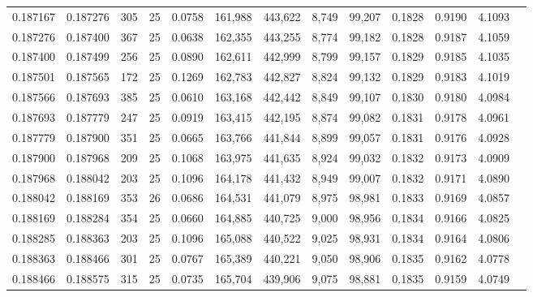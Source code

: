 \begin{tabular}{rrrrrrrrrrrrr}
0.187167 & 0.187276 &   305 &  25 &                                     0.0758 & 161,988 & 443,622 &   8,749 &  99,207 & 0.1828 & 0.9190 & 4.1093 \\
0.187276 & 0.187400 &   367 &  25 &                                     0.0638 & 162,355 & 443,255 &   8,774 &  99,182 & 0.1828 & 0.9187 & 4.1059 \\
0.187400 & 0.187499 &   256 &  25 &                                     0.0890 & 162,611 & 442,999 &   8,799 &  99,157 & 0.1829 & 0.9185 & 4.1035 \\
0.187501 & 0.187565 &   172 &  25 &                                     0.1269 & 162,783 & 442,827 &   8,824 &  99,132 & 0.1829 & 0.9183 & 4.1019 \\
0.187566 & 0.187693 &   385 &  25 &                                     0.0610 & 163,168 & 442,442 &   8,849 &  99,107 & 0.1830 & 0.9180 & 4.0984 \\
0.187693 & 0.187779 &   247 &  25 &                                     0.0919 & 163,415 & 442,195 &   8,874 &  99,082 & 0.1831 & 0.9178 & 4.0961 \\
0.187779 & 0.187900 &   351 &  25 &                                     0.0665 & 163,766 & 441,844 &   8,899 &  99,057 & 0.1831 & 0.9176 & 4.0928 \\
0.187900 & 0.187968 &   209 &  25 &                                     0.1068 & 163,975 & 441,635 &   8,924 &  99,032 & 0.1832 & 0.9173 & 4.0909 \\
0.187968 & 0.188042 &   203 &  25 &                                     0.1096 & 164,178 & 441,432 &   8,949 &  99,007 & 0.1832 & 0.9171 & 4.0890 \\
0.188042 & 0.188169 &   353 &  26 &                                     0.0686 & 164,531 & 441,079 &   8,975 &  98,981 & 0.1833 & 0.9169 & 4.0857 \\
0.188169 & 0.188284 &   354 &  25 &                                     0.0660 & 164,885 & 440,725 &   9,000 &  98,956 & 0.1834 & 0.9166 & 4.0825 \\
0.188285 & 0.188363 &   203 &  25 &                                     0.1096 & 165,088 & 440,522 &   9,025 &  98,931 & 0.1834 & 0.9164 & 4.0806 \\
0.188363 & 0.188466 &   301 &  25 &                                     0.0767 & 165,389 & 440,221 &   9,050 &  98,906 & 0.1835 & 0.9162 & 4.0778 \\
0.188466 & 0.188575 &   315 &  25 &                                     0.0735 & 165,704 & 439,906 &   9,075 &  98,881 & 0.1835 & 0.9159 & 4.0749 \\

\end{tabular}
